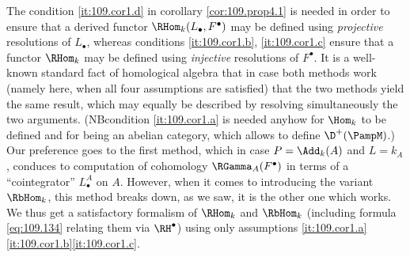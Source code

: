 \begin{remarks}
  \enspace The condition \ref{it:109.cor1.d}
  in corollary \ref{cor:109.prop4.1} is needed in order to ensure that
  a derived functor $\RHom_k(L_\bullet,F^\bullet)$ may be defined
  using \emph{projective} resolutions of $L_\bullet$, whereas
  conditions \ref{it:109.cor1.b}, \ref{it:109.cor1.c} ensure that a
  functor $\RHom_k$ may be defined using \emph{injective} resolutions
  of $F^\bullet$. It is a well-known standard fact of homological
  algebra that in case both methods work (namely here, when all four
  assumptions are satisfied) that the two methods yield the same
  result, which may equally be described by resolving simultaneously
  the two arguments. (NB\enspace condition \ref{it:109.cor1.a} is
  needed anyhow for $\Hom_k$ to be defined and for \PampM{} being an
  abelian category, which allows to define $\D^+(\PampM)$.) Our
  preference goes to the first method, which in case $P=\Add_k(A)$ and
  $L=k_A$, conduces to computation of cohomology
  $\RGamma_A(F^\bullet)$ in terms of a ``cointegrator'' $L_\bullet^A$
  on $A$. However, when it comes to introducing the variant
  $\RbHom_k$, this method breaks down, as we saw, it is the other one
  which works. We thus get a satisfactory formalism of $\RHom_k$ and
  $\RbHom_k$ (including formula \eqref{eq:109.134} relating them via
  $\RH^\bullet$) using only assumptions
  \ref{it:109.cor1.a}\ref{it:109.cor1.b}\ref{it:109.cor1.c}. 


\end{remarks}
